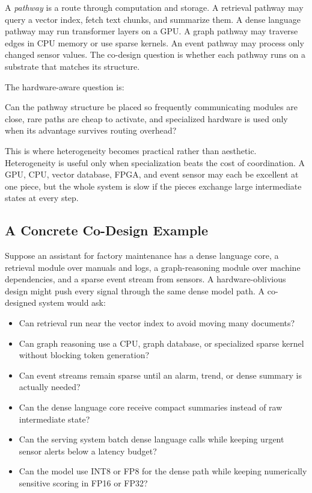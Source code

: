 A \emph{pathway} is a route through computation and storage. A retrieval pathway may query a vector index, fetch text chunks, and summarize them. A dense language pathway may run transformer layers on a GPU. A graph pathway may traverse edges in CPU memory or use sparse kernels. An event pathway may process only changed sensor values. The co-design question is whether each pathway runs on a substrate that matches its structure.

The hardware-aware question is:

\begin{aside}
Can the pathway structure be placed so frequently communicating modules are close, rare paths are cheap to activate, and specialized hardware is used only when its advantage survives routing overhead?
\end{aside}

This is where heterogeneity becomes practical rather than aesthetic. Heterogeneity is useful only when specialization beats the cost of coordination. A GPU, CPU, vector database, FPGA, and event sensor may each be excellent at one piece, but the whole system is slow if the pieces exchange large intermediate states at every step.

\subsection{A Concrete Co-Design Example}

Suppose an assistant for factory maintenance has a dense language core, a retrieval module over manuals and logs, a graph-reasoning module over machine dependencies, and a sparse event stream from sensors. A hardware-oblivious design might push every signal through the same dense model path. A co-designed system would ask:
\begin{itemize}[leftmargin=*]
  \item Can retrieval run near the vector index to avoid moving many documents?
  \item Can graph reasoning use a CPU, graph database, or specialized sparse kernel without blocking token generation?
  \item Can event streams remain sparse until an alarm, trend, or dense summary is actually needed?
  \item Can the dense language core receive compact summaries instead of raw intermediate state?
  \item Can the serving system batch dense language calls while keeping urgent sensor alerts below a latency budget?
  \item Can the model use INT8 or FP8 for the dense path while keeping numerically sensitive scoring in FP16 or FP32?
\end{itemize}

